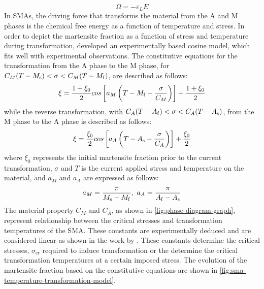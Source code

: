 \begin{equation}
  \label{eq:tensor-youngsmodulus}
  \Omega = -\varepsilon_L E
\end{equation}
In SMAs, the driving force that transforms the material from the A and M phases is the chemical free energy as a function of temperature and stress. In order to depict the martensite fraction as a function of stress and temperature during transformation, \cite{liangConstitutiveModelingShape1990a} developed an experimentally based cosine model, which fits well with experimental observations. The constitutive equations for the transformation from the A phase to the M phase, for $C_M(T-M_\mathrm{s})<\sigma<C_M(T-M_\mathrm{f})$, are described as follows:
\begin{equation}
  \label{eq:liang-MA}
  \xi=\frac{1-\xi_0}{2}cos\left[a_M\left(T-M_\mathrm{f}-\frac{\sigma}{C_M}\right)\right]+\frac{1+\xi_0}{2}
\end{equation}
while the reverse transformation, with $C_A(T-A_\mathrm{f})<\sigma<C_A(T-A_\mathrm{s})$, from the M phase to the A phase is described as follows:
\begin{equation}
  \label{eq:liang-AM}
  \xi=\frac{\xi_0}{2}cos\left[a_A\left(T-A_\mathrm{s}-\frac{\sigma}{C_A}\right)\right]+\frac{\xi_0}{2}
\end{equation}
where $\xi_0$ represents the initial martensite fraction prior to the current transformation, $\sigma$ and $T$ is the current applied stress and temperature on the material, and $a_M$ and $a_A$ are expressed as follows:
\begin{equation}
  \label{eq:aM-aA}
  a_M=\frac{\pi}{M_\mathrm{s}-M_\mathrm{f}},~a_A=\frac{\pi}{A_\mathrm{f}-A_\mathrm{s}}
\end{equation}
The material property $C_M$ and $C_A$, as shown in \cref{fig:phase-diagram-graph}, represent relationship between the critical stresses and transformation temperatures of the SMA. These constants are experimentally deduced and are considered linear as shown in the work by \cite{yooDevelopmentMartensiteTransformation2015}. These constants determine the critical stresses, $\sigma_\mathrm{cr}$ required to induce transformation or the determine the critical transformation temperatures at a certain imposed stress. The evolution of the martensite fraction based on the constitutive equations are shown in \cref{fig:sma-temperature-transformation-model}.
